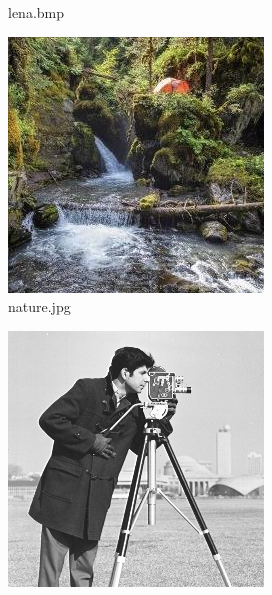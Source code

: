 \documentclass{l4proj}
\begin{document}
\begin{appendices}
\begin{figure}[!h]
\begin{subfigure}[b]{0.3\textwidth}
        \caption{lena.bmp}
        \label{lena.png}
    \end{subfigure}
    \begin{subfigure}[b]{0.3\textwidth}
        \includegraphics[width=\textwidth]{images/nature.jpg}
        \caption{nature.jpg}
        \label{nature.jpg}
    \end{subfigure}
    \begin{subfigure}[b]{0.3\textwidth}
        \includegraphics[width=\textwidth]{images/secret.png}

\end{subfigure}
\end{figure}
\end{appendices}
\end{document}
